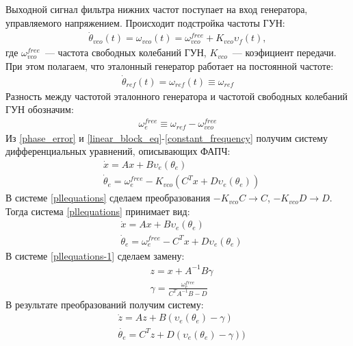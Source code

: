 \documentclass[a4paper,article,14pt]{extarticle}
\begin{document}
Выходной сигнал фильтра нижних частот поступает на вход генератора, управляемого напряжением. Происходит подстройка частоты ГУН:
 \begin{equation}\label{VCO_eq}
 \begin{aligned}
\dot{\theta}_{vco}(t) = \omega_{vco}(t) = \omega^{free}_{vco} + K_{vco}\upsilon_f(t),
 \end{aligned}
\end{equation}
где $\omega^{free}_{vco}$~--- частота свободных колебаний ГУН, $K_{vco}$~--- коэфициент передачи. При этом полагаем, что эталонный генератор работает на постоянной частоте:
 \begin{equation}
 \begin{aligned}
\dot{\theta}_{ref}(t) = \omega_{ref}(t) \equiv \omega_{ref}
 \end{aligned}
\end{equation}
Разность между частотой эталонного генератора и частотой свободных колебаний ГУН обозначим:
 \begin{equation}\label{constant_frequency}
 \begin{aligned}
\omega_e^{free} \equiv \omega_{ref} - \omega^{free}_{vco}
 \end{aligned}
\end{equation}
Из \eqref{phase_error} и \eqref{linear_block_eq}-\eqref{constant_frequency} получим систему дифференциальных уравнений, описывающих ФАПЧ:
 \begin{equation}\label{pllequations}
 \begin{aligned}
 &\dot{x} = Ax + B\upsilon_e(\theta_e)\\
 &\dot{\theta}_e = \omega_e^{free} - K_{vco}(C^Tx + D\upsilon_e(\theta_e))
 \end{aligned}
\end{equation}
В системе \eqref{pllequations} сделаем преобразования $-K_{vco}C \rightarrow C$, $-K_{vco}D \rightarrow D$. Тогда система \eqref{pllequations} принимает вид:
 \begin{equation}\label{pllequations-1}
 \begin{aligned}
 &\dot{x} = Ax + B\upsilon_e(\theta_e)\\
 &\dot{\theta}_e = \omega_e^{free} - C^Tx + D\upsilon_e(\theta_e)
 \end{aligned}
\end{equation}
В системе \eqref{pllequations-1} сделаем замену:
 \begin{equation}
 \begin{aligned}
 &z = x + A^{-1}B\gamma \\
 &\gamma = \frac{\omega_e^{free}}{C^TA^{-1}B-D}
 \end{aligned}
\end{equation}
В результате преобразований получим систему:
 \begin{equation}\label{system_pll}
 \begin{aligned}
 &\dot{z} = Az + B(\upsilon_e(\theta_e) - \gamma)\\
 &\dot{\theta_e} = C^Tz + D(\upsilon_e(\theta_e) - \gamma))
 \end{aligned}
\end{equation}
\end{document}
